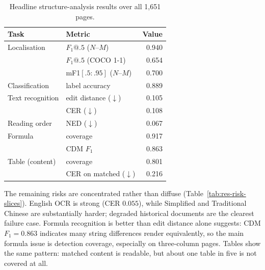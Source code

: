 \begin{table}[H]
\centering
\caption{Headline structure-analysis results over all 1{,}651 pages.}
\label{tab:res-headline}
\small
\begin{tabular}{@{}l l r@{}}
\toprule
\textbf{Task} & \textbf{Metric} & \textbf{Value} \\
\midrule
Localisation      & $F_1@.5$ ($N$--$M$)          & 0.940 \\
                  & $F_1@.5$ (COCO 1-1)         & 0.654 \\
                  & mF1$[.5{:}.95]$ ($N$--$M$)   & 0.700 \\
Classification    & label accuracy              & 0.889 \\
Text recognition  & edit distance ($\downarrow$) & 0.105 \\
                  & CER ($\downarrow$)          & 0.108 \\
Reading order     & NED ($\downarrow$)          & 0.067 \\
Formula           & coverage                    & 0.917 \\
                  & CDM $F_1$                   & 0.863 \\
Table (content)   & coverage                    & 0.801 \\
                  & CER on matched ($\downarrow$) & 0.216 \\
\bottomrule
\end{tabular}
\end{table}

The remaining risks are concentrated rather than diffuse
(Table~\ref{tab:res-risk-slices}). English OCR is strong (CER $0.055$), while
Simplified and Traditional Chinese are substantially harder; degraded historical
documents are the clearest failure case. Formula recognition is better than
edit distance alone suggests: CDM $F_1=0.863$ indicates many string differences
render equivalently, so the main formula issue is detection coverage, especially
on three-column pages. Tables show the same pattern: matched content is readable,
but about one table in five is not covered at all.

